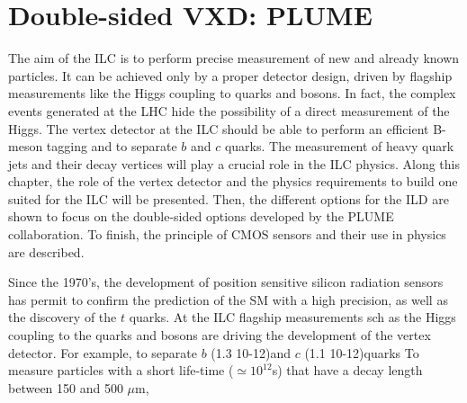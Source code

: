 \chapter{Double-sided VXD: PLUME}
\label{chap:vxd}


  The aim of the \gls{ILC} is to perform precise measurement of new and already known particles. 
  It can be achieved only by a proper detector design, driven by flagship measurements like the Higgs coupling to quarks and bosons.
  In fact, the complex events generated at the \gls{LHC} hide the possibility of a direct measurement of the Higgs.
  The vertex detector at the \gls{ILC} should be able to perform an efficient B-meson tagging and to separate $b$ and $c$ quarks.
  The measurement of heavy quark jets and their decay vertices will play a crucial role in the \gls{ILC} physics.
  Along this chapter, the role of the vertex detector and the physics requirements to build one suited for the \gls{ILC} will be presented.
  Then, the different options for the \gls{ILD} are shown to focus on the double-sided options developed by the PLUME collaboration.
  To finish, the principle of \gls{CMOS} sensors and their use in physics are described.

  Since the 1970's, the development of position sensitive silicon radiation sensors has permit to confirm the prediction of the \gls{SM} with a high precision, as well as the discovery of the $t$ quarks.
  At the \gls{ILC} flagship measurements sch as the Higgs coupling to the quarks and bosons are driving the development of the vertex detector.
  For example, to separate $b$ (1.3 10-12)and $c$ (1.1 10-12)quarks
  To measure particles with a short life-time ($\simeq 10^{12}$s) that have a decay length between 150 and 500 $\mu$m, 


